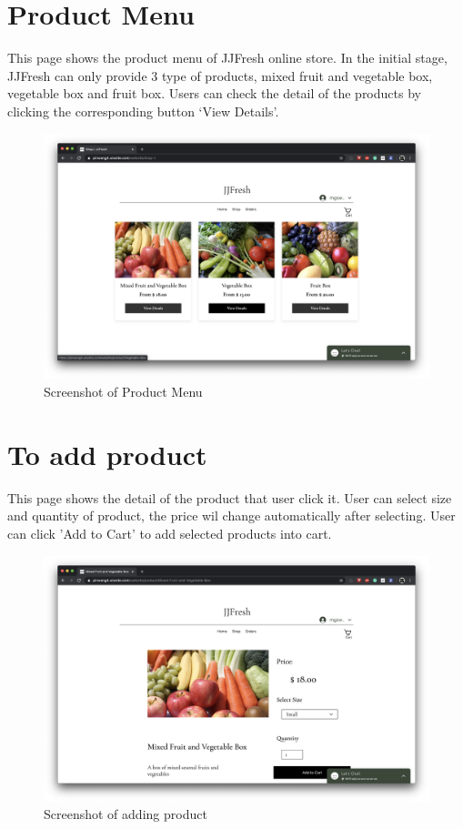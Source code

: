 \section*{Product Menu}
This page shows the product menu of JJFresh online store. In the initial stage, JJFresh can only provide 3 type of products, mixed fruit and vegetable box, vegetable box and fruit box. Users can check the detail of the products by clicking the corresponding button ‘View Details’.
\begin{figure}[htp]
\centering
\includegraphics[width=\textwidth]{Figures/productMenu.png}
\caption{Screenshot of Product Menu }
\label{fig:productMenu}
\end{figure}

\clearpage
\section*{To add product}
This page shows the detail of the product that user click it. User can select size and quantity of product, the price wil change automatically after selecting. User can click 'Add to Cart' to add selected products into cart.
\begin{figure}[htp]
\centering
\includegraphics[width=\textwidth]{Figures/addProduct.png}
\caption{Screenshot of adding product}
\label{fig:addProduct}
\end{figure}

